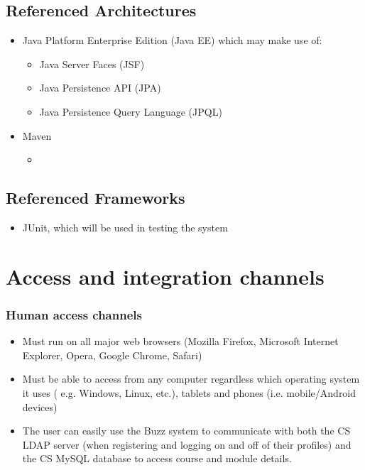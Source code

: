 \documentclass[12pt, oneside]{article}
\begin{document}
	\subsection{Referenced Architectures}
		\begin{itemize}
			\item Java Platform Enterprise Edition (Java EE) which may make use of:
				\begin{itemize}
					\item Java Server Faces (JSF)
					\item Java Persistence API (JPA)
					\item Java Persistence Query Language (JPQL)
				\end{itemize}
			\item Maven
				\begin{itemize}
					\item 
				\end{itemize}
			
		\end{itemize}
	\subsection{Referenced Frameworks}
		\begin{itemize}
			\item JUnit, which will be used in testing the system
		\end{itemize}
\section{Access and integration channels}
	\subsubsection{Human access channels}
		\begin{itemize}
			\item Must run on all major web browsers (Mozilla Firefox, Microsoft Internet Explorer, Opera, Google Chrome, Safari)
			\item Must be able to access from any computer regardless which operating system it uses ( e.g. Windows, Linux, etc.), tablets and phones (i.e. mobile/Android devices)
			\item The user can easily use the Buzz system to communicate with both the CS LDAP server (when registering and logging on and off of their profiles) and the CS MySQL database to access course and module details.
		\end{itemize}
\end{document}
